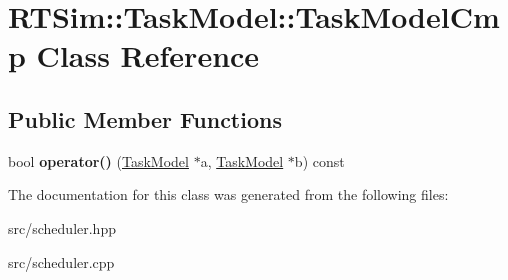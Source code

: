 \hypertarget{classRTSim_1_1TaskModel_1_1TaskModelCmp}{}\section{R\+T\+Sim\+:\+:Task\+Model\+:\+:Task\+Model\+Cmp Class Reference}
\label{classRTSim_1_1TaskModel_1_1TaskModelCmp}
\subsection*{Public Member Functions}
\begin{DoxyCompactItemize}
\item 
bool {\bfseries operator()} (\hyperlink{classRTSim_1_1TaskModel}{Task\+Model} $\ast$a, \hyperlink{classRTSim_1_1TaskModel}{Task\+Model} $\ast$b) const \hypertarget{classRTSim_1_1TaskModel_1_1TaskModelCmp_a04c365b2e97e36cee6e14a2c75b2c839}{}\label{classRTSim_1_1TaskModel_1_1TaskModelCmp_a04c365b2e97e36cee6e14a2c75b2c839}

\end{DoxyCompactItemize}


The documentation for this class was generated from the following files\+:\begin{DoxyCompactItemize}
\item 
src/scheduler.\+hpp\item 
src/scheduler.\+cpp\end{DoxyCompactItemize}
